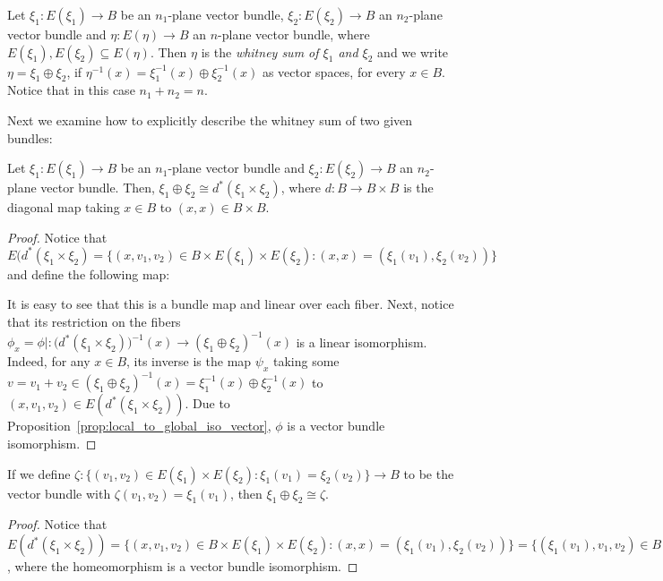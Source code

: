 \begin{definition} Let $\xi_1:E(\xi_1)\to B$ be an $n_1$-plane vector bundle, $\xi_2:E(\xi_2)\to B$ an $n_2$-plane vector bundle and $\eta:E(\eta)\to B$ an $n$-plane vector bundle, where $E(\xi_1),E(\xi_2)\subseteq E(\eta)$. Then $\eta$ is the \emph{whitney sum of $\xi_1$ and $\xi_2$} and we write $\eta=\xi_1\oplus\xi_2$, if $\eta^{-1}(x)=\xi_1^{-1}(x)\oplus\xi_2^{-1}(x)$ as vector spaces, for every $x\in B$. Notice that in this case $n_1+n_2=n$.
\end{definition}

Next we examine how to explicitly describe the whitney sum of two given bundles:
\begin{proposition} Let $\xi_1:E(\xi_1)\to B$ be an $n_1$-plane vector bundle and $\xi_2:E(\xi_2)\to B$ an $n_2$-plane vector bundle. Then, $\xi_1\oplus\xi_2\cong d^*(\xi_1\times\xi_2)$, where $d:B\to B\times B$ is the diagonal map taking $x\in B$ to $(x,x)\in B\times B$.
\end{proposition}
\begin{proof} Notice that $E(d^*(\xi_1\times\xi_2)=\big\{(x,v_1,v_2)\in B\times E(\xi_1)\times E(\xi_2):(x,x)=(\xi_1(v_1),\xi_2(v_2))\big\}$ and define the following map:
\begin{center}
\end{center}
It is easy to see that this is a bundle map and linear over each fiber. Next, notice that its restriction on the fibers $\phi_x=\phi|:\big(d^*(\xi_1\times\xi_2)\big)^{-1}(x)\to(\xi_1\oplus\xi_2)^{-1}(x)$ is a linear isomorphism. Indeed, for any $x\in B$, its inverse is the map $\psi_x$ taking some $v=v_1+v_2\in(\xi_1\oplus\xi_2)^{-1}(x)=\xi_1^{-1}(x)\oplus\xi_2^{-1}(x)$ to $(x,v_1,v_2)\in E(d^*(\xi_1\times\xi_2))$. Due to Proposition~\ref{prop:local_to_global_iso_vector}, $\phi$ is a vector bundle isomorphism.
\end{proof}
\begin{remark} If we define $\zeta:\big\{(v_1,v_2)\in E(\xi_1)\times E(\xi_2):\xi_1(v_1)=\xi_2(v_2)\big\}\to B$ to be the vector bundle with $\zeta(v_1,v_2)=\xi_1(v_1)$, then $\xi_1\oplus\xi_2\cong\zeta$.
\end{remark}
\begin{proof} Notice that
$E(d^*(\xi_1\times\xi_2))=\big\{(x,v_1,v_2)\in B\times E(\xi_1)\times E(\xi_2):(x,x)=(\xi_1(v_1),\xi_2(v_2))\big\}
=\big\{(\xi_1(v_1),v_1,v_2)\in B\times E(\xi_1)\times E(\xi_2):\xi_1(v_1)=\xi_2(v_2)\big\}
\cong\big\{(v_1,v_2)\in E(\xi_1)\times E(\xi_2):\xi_1(v_1)=\xi_2(v_2)\big\}=E(\zeta)$,
where the homeomorphism is a vector bundle isomorphism.
\end{proof}
